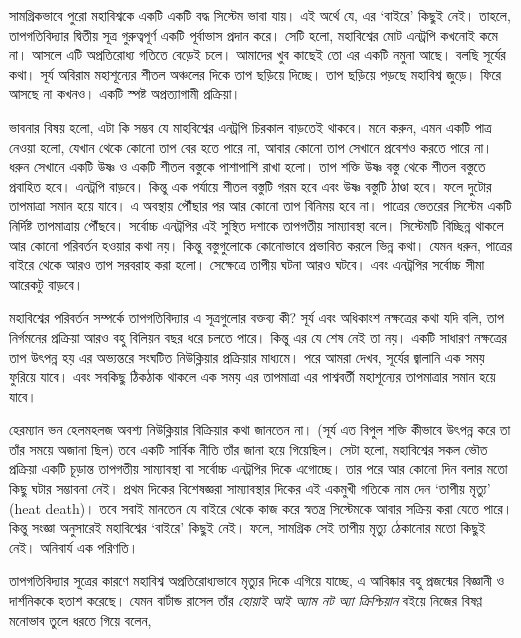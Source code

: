 \documentclass[
]{book}
\begin{document}
সামগ্রিকভাবে পুরো মহাবিশ্বকে একটি একটি বদ্ধ সিস্টেম ভাবা যায়। এই অর্থে যে, এর `বাইরে' কিছুই নেই। তাহলে, তাপগতিবিদ্যার দ্বিতীয় সূত্র গুরুত্বপূর্ণ একটি পূর্বাভাস প্রদান করে। সেটি হলো, মহাবিশ্বের মোট এনট্রপি কখনোই কমে না। আসলে এটি অপ্রতিরোধ্য গতিতে বেড়েই চলে। আমাদের খুব কাছেই তো এর একটি নমুনা আছে। বলছি সূর্যের কথা। সূর্য অবিরাম মহাশূন্যের শীতল অঞ্চলের দিকে তাপ ছড়িয়ে দিচ্ছে। তাপ ছড়িয়ে পড়ছে মহাবিশ্ব জুড়ে। ফিরে আসছে না কখনও। একটি স্পষ্ট অপ্রত্যাগামী প্রক্রিয়া।

ভাবনার বিষয় হলো, এটা কি সম্ভব যে মাহবিশ্বের এনট্রপি চিরকাল বাড়তেই থাকবে। মনে করুন, এমন একটি পাত্র নেওয়া হলো, যেখান থেকে কোনো তাপ বের হতে পারে না, আবার কোনো তাপ সেখানে প্রবেশও করতে পারে না। ধরুন সেখানে একটি উষ্ণ ও একটি শীতল বস্তুকে পাশাপাশি রাখা হলো। তাপ শক্তি উষ্ণ বস্তু থেকে শীতল বস্তুতে প্রবাহিত হবে। এনট্রপি বাড়বে। কিন্তু এক পর্যায়ে শীতল বস্তুটি গরম হবে এবং উষ্ণ বস্তুটি ঠাণ্ডা হবে। ফলে দুটোর তাপমাত্রা সমান হয়ে যাবে। এ অবস্থায় পৌঁছার পর আর কোনো তাপ বিনিময় হবে না। পাত্রের ভেতরের সিস্টেম একটি নির্দিষ্ট তাপমাত্রায় পৌঁছবে। সর্বোচ্চ এনট্রপির এই সুস্থিত দশাকে তাপগতীয় সাম্যাবস্থা বলে। সিস্টেমটি বিচ্ছিন্ন থাকলে আর কোনো পরিবর্তন হওয়ার কথা নয়। কিন্তু বস্তুগুলোকে কোনোভাবে প্রভাবিত করলে ভিন্ন কথা। যেমন ধরুন, পাত্রের বাইরে থেকে আরও তাপ সরবরাহ করা হলো। সেক্ষেত্রে তাপীয় ঘটনা আরও ঘটবে। এবং এনট্রপির সর্বোচ্চ সীমা আরেকটু বাড়বে।

মহাবিশ্বের পরিবর্তন সম্পর্কে তাপগতিবিদ্যার এ সূত্রগুলোর বক্তব্য কী? সূর্য এবং অধিকাংশ নক্ষত্রের কথা যদি বলি, তাপ নির্গমনের প্রক্রিয়া আরও বহু বিলিয়ন বছর ধরে চলতে পারে। কিন্তু এর যে শেষ নেই তা নয়। একটি সাধারণ নক্ষত্রের তাপ উৎপন্ন হয় এর অভ্যন্তরে সংঘটিত নিউক্লিয়ার প্রক্রিয়ার মাধ্যমে। পরে আমরা দেখব, সূর্যের জ্বালানি এক সময় ফুরিয়ে যাবে। এবং সবকিছু ঠিকঠাক থাকলে এক সময় এর তাপমাত্রা এর পাশ্ববর্তী মহাশূন্যের তাপমাত্রার সমান হয়ে যাবে।

হেরম্যান ভন হেলমহলজ অবশ্য নিউক্লিয়ার বিক্রিয়ার কথা জানতেন না। (সূর্য এত বিপুল শক্তি কীভাবে উৎপন্ন করে তা তাঁর সময়ে অজানা ছিল) তবে একটি সার্বিক নীতি তাঁর জানা হয়ে গিয়েছিল। সেটা হলো, মহাবিশ্বের সকল ভৌত প্রক্রিয়া একটি চূড়ান্ত তাপগতীয় সাম্যাবস্থা বা সর্বোচ্চ এনট্রপির দিকে এগোচ্ছে। তার পরে আর কোনো দিন বলার মতো কিছু ঘটার সম্ভাবনা নেই। প্রথম দিকের বিশেষজ্ঞরা সাম্যাবস্থার দিকের এই একমুখী গতিকে নাম দেন `তাপীয় মৃত্যু' (heat death)। তবে সবাই মানতেন যে বাইরে থেকে কাজ করে স্বতন্ত্র সিস্টেমকে আবার সক্রিয় করা যেতে পারে। কিন্তু সংজ্ঞা অনুসারেই মহাবিশ্বের `বাইরে' কিছুই নেই। ফলে, সামগ্রিক সেই তাপীয় মৃত্যু ঠেকানোর মতো কিছুই নেই। অনিবার্য এক পরিণতি।

তাপগতিবিদ্যার সূত্রের কারণে মহাবিশ্ব অপ্রতিরোধ্যভাবে মৃত্যুর দিকে এগিয়ে যাচ্ছে, এ আবিষ্কার বহু প্রজন্মের বিজ্ঞানী ও দার্শনিককে হতাশ করেছে। যেমন বার্টান্ড রাসেল তাঁর \emph{হোয়াই আই অ্যাম নট অ্যা ক্রিশ্চিয়ান} বইয়ে নিজের বিষণ্ণ মনোভাব তুলে ধরতে গিয়ে বলেন,
\end{document}
